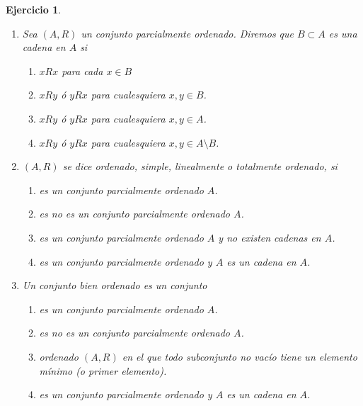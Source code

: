\documentclass[twoside,12pt,a4 paper,openright]{book}
\newtheorem{ejer}[claim]{Ejercicio}
\begin{document}
\begin{ejer}
\begin{enumerate}
\newpage

\item  Sea  $(A,R) $ un conjunto parcialmente ordenado. Diremos que  $B\subset A$ es una cadena en $A$ 
si
          {\small
    \begin{enumerate}
\item[\textcolor{red}{$\bullet$}] {} $xRx$ para cada $x\in B$
\item[\textcolor{blue}{$\bullet$}] {} $x R y$ \'o $yRx$ para cualesquiera $x,y\in B$. 
\item[\textcolor{yellow}{$\bullet$}] {} $x R y$ \'o $yRx$ para cualesquiera $x,y\in A$. 
\item[\textcolor{green}{$\bullet$}] {} $x R y$ \'o $yRx$ para cualesquiera $x,y\in A\setminus B$. 
\end{enumerate}
}

\newpage


 \item $(A,R)$ se dice ordenado, simple, linealmente o totalmente ordenado, si 
          {\small
    \begin{enumerate}
\item[\textcolor{red}{$\bullet$}] {} es un conjunto parcialmente ordenado $A$. 
\item[\textcolor{blue}{$\bullet$}] {} es no es un conjunto parcialmente ordenado $A$.
\item[\textcolor{yellow}{$\bullet$}] {} es un conjunto parcialmente ordenado $A$ y no existen cadenas en $A$. 
\item[\textcolor{green}{$\bullet$}] {} es un conjunto parcialmente ordenado y $A$ es un cadena en $A$. 
 \end{enumerate}
}


 



 


\newpage


\item Un conjunto bien ordenado es un conjunto 
          {\small
    \begin{enumerate}
\item[\textcolor{red}{$\bullet$}] {} es un conjunto parcialmente ordenado $A$. 
\item[\textcolor{blue}{$\bullet$}] {} es no es un conjunto parcialmente ordenado $A$.
\item[\textcolor{yellow}{$\bullet$}] {} ordenado  $(A,R) $ en el que todo subconjunto no vac\'io tiene un elemento m\'inimo (o primer elemento).
\item[\textcolor{green}{$\bullet$}] {} es un conjunto parcialmente ordenado y $A$ es un cadena en $A$. 
 \end{enumerate}
}



\end{enumerate}
\end{ejer}
\end{document}
